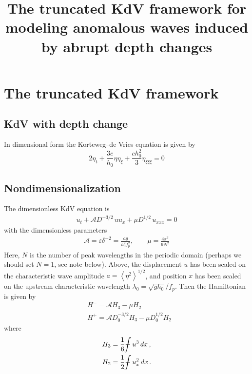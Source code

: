 \documentclass[11pt]{article}
\newcommand{\mean}[1]{\left< #1 \right>}
\newcommand{\eps}{\varepsilon}
\newcommand{\ampp}{\mathcal{A}}
\newcommand{\lamfac}{N}
\newcommand{\Hp}{H^{+}}
\newcommand{\Hm}{H^{-}}
\def\Xint#1{\mathchoice
   {\XXint\displaystyle\textstyle{#1}}%
   {\XXint\textstyle\scriptstyle{#1}}%
   {\XXint\scriptstyle\scriptscriptstyle{#1}}%
   {\XXint\scriptscriptstyle\scriptscriptstyle{#1}}%
   \!\int}
\def\XXint#1#2#3{{\setbox0=\hbox{$#1{#2#3}{\int}$}
     \vcenter{\hbox{$#2#3$}}\kern-.5\wd0}}
\def\dashint{\Xint-}
\newcommand{\intt}{\dashint}%
\newcommand{\dx}{\, dx}
\begin{document}
\title{The truncated KdV framework for modeling anomalous waves induced by abrupt depth changes}

\maketitle



\section{The truncated KdV framework}

\subsection{KdV with depth change}
In dimensional form the Korteweg–de Vries equation is given by
\begin{equation}
2 \eta_t + \frac{3 c}{h_0} \eta \eta_{\xi} + \frac{c h_0^2}{3} \eta_{\xi \xi \xi} = 0
\end{equation}
 
\subsection{Nondimensionalization}

The dimensionless KdV equation is
\begin{align}
\label{varKdV}
u_t + \ampp D^{-3/2} \, u u_x + \mu D^{1/2} \, u_{xxx} = 0
\end{align}
with the dimensionless parameters
\begin{align}
\ampp = \eps \delta^{-2} = \frac{ag}{h_0^2 f_p^2} , \qquad
\mu = \frac{4 \pi^2}{9 \lamfac^2}
\end{align}
Here, $\lamfac$ is the number of peak wavelengths in the periodic domain (perhaps we should set $\lamfac=1$, see note below). Above, the displacement $u$ has been scaled on the characteristic wave amplitude $a = \mean{\eta^2}^{1/2}$, and position $x$ has been scaled on the upstream characteristic wavelength $\lambda_0 = \sqrt{g h_0}/f_p$.
Then the Hamiltonian is given by
\begin{align}
\label{Hamiltonian}
& \Hm = \ampp H_3 - \mu H_2 \\
& \Hp = \ampp D_0^{-3/2} H_3 - \mu D_0^{1/2} H_2
\end{align}
where
\begin{align}
&H_3 = \frac{1}{6} \intt u^3 \dx	\, , \\
&H_2 = \frac{1}{2} \intt u_x^2 \dx	\, .
\end{align}
\end{document}
